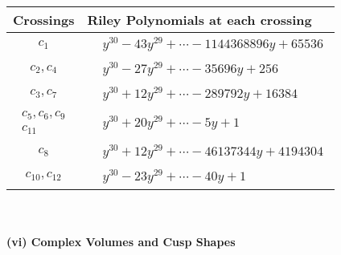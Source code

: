 \documentclass[1p]{elsarticle_modified}
\theoremstyle{definition}
\begin{document}
\begin{tabular}{m{50pt}|m{274pt}}
Crossings & \hspace{64pt}Riley Polynomials at each crossing \\
\hline $$\begin{aligned}c_{1}\end{aligned}$$&$\begin{aligned}
&y^{30}-43 y^{29}+\cdots-1144368896 y+65536
\end{aligned}$\\
\hline $$\begin{aligned}c_{2},c_{4}\end{aligned}$$&$\begin{aligned}
&y^{30}-27 y^{29}+\cdots-35696 y+256
\end{aligned}$\\
\hline $$\begin{aligned}c_{3},c_{7}\end{aligned}$$&$\begin{aligned}
&y^{30}+12 y^{29}+\cdots-289792 y+16384
\end{aligned}$\\
\hline $$\begin{aligned}c_{5},c_{6},c_{9}\\c_{11}\end{aligned}$$&$\begin{aligned}
&y^{30}+20 y^{29}+\cdots-5 y+1
\end{aligned}$\\
\hline $$\begin{aligned}c_{8}\end{aligned}$$&$\begin{aligned}
&y^{30}+12 y^{29}+\cdots-46137344 y+4194304
\end{aligned}$\\
\hline $$\begin{aligned}c_{10},c_{12}\end{aligned}$$&$\begin{aligned}
&y^{30}-23 y^{29}+\cdots-40 y+1
\end{aligned}$\\
\hline
\end{tabular}\\~\\
\newpage\flushleft \textbf{(vi) Complex Volumes and Cusp Shapes}
\end{document}
